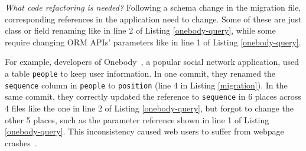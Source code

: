 



\textit{What code refactoring is needed?} Following a schema
change in the migration file, corresponding references in the
application need to change. Some of these are just
class or field renaming like in line 2 of Listing \ref{onebody-query}, while some require changing ORM APIs' parameters like in line 1 of Listing \ref{onebody-query}.

For example, developers of Onebody~\cite{onebody}, a popular social network application, used 
a table \texttt{people} to keep user information. In one commit, they renamed the \texttt{sequence} column in \texttt{people} to \texttt{position} (line 4 in Listing \ref{migration}). In the same commit, they
correctly updated the reference to \texttt{sequence} in 6 places across 4 files like the one in line 2 of Listing \ref{onebody-query}, but forgot to change the other 5 places, 
such as the parameter reference shown in line 1 of Listing
\ref{onebody-query}. This inconsistency caused web users to
suffer from webpage crashes~\cite{onebodyissue672}.




